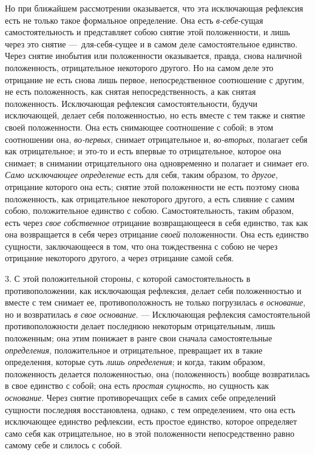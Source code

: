 Но при ближайшем рассмотрении оказывается, что эта исключающая рефлексия
есть не только такое формальное определение. Она есть
{\em в-себе}{}-сущая самостоятельность и представляет
собою снятие этой положенности, и лишь через это снятие —~для-себя-сущее и
в самом деле самостоятельное единство. Через снятие инобытия или
положенности оказывается, правда, снова наличной положенность,
отрицательное некоторого другого. Но на самом деле это отрицание не есть
снова лишь первое, непосредственное соотношение с другим, не есть
положенность, как снятая непосредственность, а как снятая положенность.
Исключающая рефлексия самостоятельности, будучи исключающей, делает себя
положенностью, но есть вместе с тем также и снятие своей положенности. Она
есть снимающее соотношение с собой; в этом соотношении она,
{\em во-первых}, снимает отрицательное и,
{\em во-вторых}, полагает себя как отрицательное; и
это-то и есть впервые то отрицательное, которое она снимает; в снимании
отрицательного она одновременно и полагает и снимает его.
{\em Само исключающее определение} есть для себя, таким
образом, то {\em другое}, отрицание которого она есть;
снятие этой положенности не есть поэтому снова положенность, как
отрицательное некоторого другого, а есть слияние с самим собою,
положительное единство с собою. Самостоятельность, таким образом, есть
через {\em свое собственное} отрицание возвращающееся в
себя единство, так как она возвращается в себя через отрицание
{\em своей} положенности. Она есть единство сущности,
заключающееся в том, что она тождественна с собою не через отрицание
некоторого другого, а через отрицание самой себя.

3. С этой положительной стороны, с которой самостоятельность в
противоположении, как исключающая рефлексия, делает себя положенностью и
вместе с тем снимает ее, противоположность не только погрузилась
{\em в основание}, но и возвратилась
{\em в свое основание}. — Исключающая рефлексия
самостоятельной противоположности делает последнюю некоторым отрицательным,
лишь положенным; она этим понижает в ранге свои сначала самостоятельные
{\em определения}, положительное и отрицательное,
превращает их в такие определения, которые суть
{\em лишь определения}; и когда, таким образом,
положенность делается положенностью, она (положенность) вообще возвратилась
в свое единство с собой; она есть {\em простая
сущность}, но сущность как {\em основание}. Через
снятие противоречащих себе в самих себе определений сущности последняя
восстановлена, однако, с тем определением, что она есть исключающее
единство рефлексии, есть простое единство, которое определяет само себя как
отрицательное, но в этой положенности непосредственно равно самому себе и
слилось с собой.

